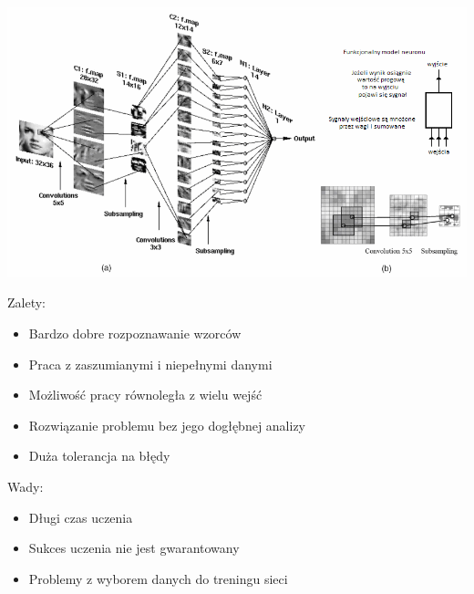 \documentclass[11pt,a4paper]{article}
\begin{document}
\vspace*{1cm}
\includegraphics[scale=0.65]{cnn.png}
\vspace*{1cm}

\noindent 
Zalety:
\begin{itemize}
\item  Bardzo dobre rozpoznawanie wzorców
\item  Praca z zaszumianymi i niepełnymi danymi
\item  Możliwość pracy równoległa z wielu wejść
\item  Rozwiązanie problemu bez jego dogłębnej analizy
\item  Duża tolerancja na błędy
\end{itemize}

\noindent 
Wady:
\begin{itemize}
\item  Długi czas uczenia 
\item  Sukces uczenia nie jest gwarantowany 
\item  Problemy z wyborem danych do treningu sieci 
\end{itemize}
\end{document}
